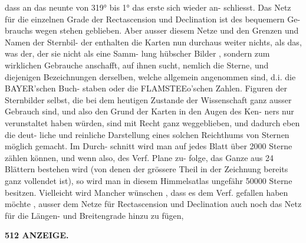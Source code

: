 \documentclass[12pt,a4paper]{article}
\begin{document}
dass  an  das  neunte  von  319°  bis  1°  das  erste  sich  wieder  an- schliesst.  Das  Netz  für  die  einzelnen  Grade  der  Rectascension  und  Declination  ist  des  bequemern  Ge- brauchs wegen  stehen  geblieben.  Aber  ausser  diesem  Netze  und  den  Grenzen  und  Namen  der  Sternbil- der enthalten  die  Karten  nun  durchaus  weiter  nichts,  als  das,  was  der,  der  sie  nicht  als  eine  Samm- lung hübscher  Bilder ,  sondern  zum  wirklichen  Gebrauche  anschafft,  auf  ihnen  sucht,  nemlich  die  Sterne, und  diejenigen  Bezeichnungen  derselben,  welche  allgemein  angenommen  sind,  d.i.  die  BAYER'schen  Buch- staben oder  die  FLAMSTEEo'schen  Zahlen.  Figuren  der  Sternbilder  selbst,  die  bei  dem  heutigen  Zustande der  Wissenschaft  ganz  ausser  Gebrauch  sind,  und  also  den  Grund  der  Karten  in  den  Augen  des  Ken- ners nur  verunstaltet  haben  würden,  sind  mit  Recht  ganz  weggeblieben,  und  dadurch  eben  die  deut- liche und  reinliche  Darstellung  eines  solchen  Reichthums  von  Sternen  möglich  gemacht.  Im  Durch- schnitt wird  man  auf  jedes  Blatt  über  2000  Sterne  zählen  können,  und  wenn  also,  des  Verf.  Plane  zu- folge, das  Ganze  aus  24  Blättern  bestehen  wird  (von  denen  der  grössere  Theil  in  der  Zeichnung  bereits ganz  vollendet  ist),  so  wird  man  in  diesem  Himmelsatlas  ungefähr  50000  Sterne  besitzen. Vielleicht  wird  Mancher  wünschen ,  dass  es  dem  Verf.  gefallen  haben  möchte ,  ausser  dem  Netze für  Rectascension  und  Declination  auch  noch  das  Netz  für  die  Längen-  und  Breitengrade  hinzu  zu  fügen,

\vspace{0.5em}


\noindent\textbf{512  ANZEIGE.}
\end{document}
